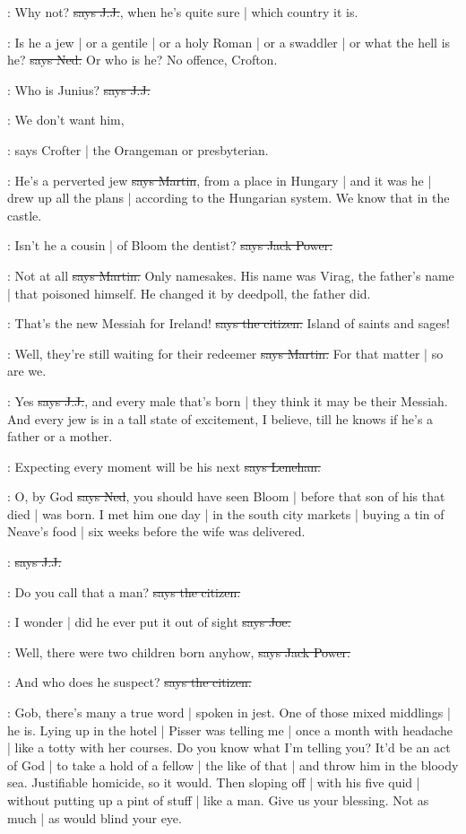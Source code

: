 \jjom:
Why not?
\sout{says J.J.},
when he's quite sure |
which country it is.

\lambert:
Is he a jew |
or a gentile |
or a holy Roman |
or a swaddler |
or what the hell is he?
\sout{says Ned.}
Or who is he?
No offence,
Crofton.

\jjom:
Who is Junius?
\sout{says J.J.}

\crofton:
We don't want him,

\Nq:
says Crofter |
the Orangeman or presbyterian.

\cunningham:
He's a perverted jew
\sout{says Martin},
from a place in Hungary |
and it was he |
drew up all the plans |
according to the Hungarian system.
We know that in the castle.

\power:
Isn't he a cousin |
of Bloom the dentist?
\sout{says Jack Power.}

\cunningham:
Not at all
\sout{says Martin.}
Only namesakes.
His name was Virag,
the father's name |
that poisoned himself.
He changed it by deedpoll,
the father did.

\citizen:
That's the new Messiah for Ireland!
\sout{says the citizen.}
Island of saints and sages!

\cunningham:
Well,
they're still waiting for their redeemer
\sout{says Martin.}
For that matter |
so are we.

\jjom:
Yes
\sout{says J.J.},
and every male that's born |
they think it may be their Messiah.
And every jew is in a tall state of excitement,
I believe,
till he knows if he's a father or a mother.

\lenehan:
Expecting every moment will be his next
\sout{says Lenehan.}

\lambert:
O,
by God
\sout{says Ned},
you should have seen Bloom |
before that son of his that died |
was born.
I met him one day |
in the south city markets |
buying a tin of Neave's food |
six weeks before the wife was delivered.

\jjom:
\sout{says J.J.}

\citizen:
Do you call that a man?
\sout{says the citizen.}

\joe:
I wonder |
did he ever put it out of sight
\sout{says Joe.}

\power:
Well,
there were two children born anyhow,
\sout{says Jack Power.}

\citizen:
And who does he suspect?
\sout{says the citizen.}

\Nq:
Gob,
there's many a true word |
spoken in jest.
One of those mixed middlings |
he is.
Lying up in the hotel |
Pisser was telling me |
once a month with headache |
like a totty with her courses.
Do you know what I'm telling you?
It'd be an act of God |
to take a hold of a fellow |
the like of that |
and throw him in the bloody sea.
Justifiable homicide,
so it would.
Then sloping off |
with his five quid |
without putting up a pint of stuff |
like a man.
Give us your blessing.
Not as much |
as would blind your eye.

